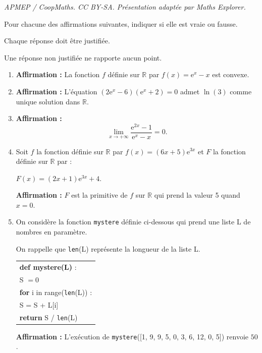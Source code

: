 \documentclass[10pt]{article}
\providecommand{\R}{\mathbb{R}}
\begin{document}
\noindent\textit{APMEP / CoopMaths. CC BY-SA. Présentation adaptée par Maths Explorer.}\par\medskip
\medskip

Pour chacune des affirmations suivantes, indiquer si elle est vraie ou fausse. 

Chaque réponse doit être justifiée. 

Une réponse non justifiée ne rapporte aucun point.

\medskip

\begin{enumerate}
\item \textbf{Affirmation :} La fonction $f$ définie sur $\R$ par $f(x) = \text{e}^x - x$ est convexe.
\item \textbf{Affirmation :} L'équation $\left(2\text{e}^x - 6\right)\left(\text{e}^x + 2\right) = 0$ admet $\ln (3)$ comme unique solution dans $\R$.
\item \textbf{Affirmation :}
\[\displaystyle\lim_{x \to + \infty} \dfrac{\text{e}^{2x} - 1}{\text{e}^x - x} = 0.\]

\item Soit $f$ la fonction définie sur $\R$ par $f(x) = (6x + 5)\text{e}^{3x}$ et $F$ la fonction définie sur $\R$ par : 

$F(x) = (2x + 1)\text{e}^{3x} + 4$.

\textbf{Affirmation :} $F$ est la primitive de $f$ sur $\R$ qui prend la valeur 5 quand $x = 0$.
\item On considère la fonction \texttt{mystere} définie ci-dessous qui prend une liste L de nombres en paramètre.

On rappelle que \texttt{len}(L) représente la longueur de la liste L.

\begin{center}
\begin{tabular}{|l|}\hline
\textbf{def mystere(L)} :\\
	\quad  S $= 0$\\
	\quad \textbf{for} i in range(\texttt{len}(L)) :\\
	\quad \qquad S = S + L[i]\\
	\quad \textbf{return} S / \texttt{len}(L)\\ \hline
	\end{tabular}
\end{center}

\textbf{Affirmation :} L'exécution de \texttt{mystere}([1, 9, 9, 5, 0, 3, 6,  12, 0, 5]) renvoie $50$.
\end{enumerate}

\bigskip
\end{document}
